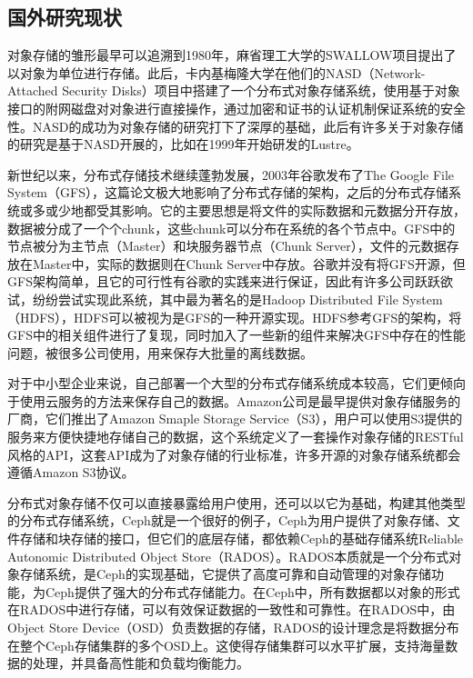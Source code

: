 \subsection{国外研究现状}%
对象存储的雏形最早可以追溯到1980年，麻省理工大学的SWALLOW项目提出了以对象为单位进行存储\cite{7}。此后，卡内基梅隆大学在他们的NASD\cite{8}（Network-Attached Security Disks）项目中搭建了一个分布式对象存储系统，使用基于对象接口的附网磁盘对对象进行直接操作，通过加密和证书的认证机制保证系统的安全性。NASD的成功为对象存储的研究打下了深厚的基础，此后有许多关于对象存储的研究是基于NASD开展的，比如在1999年开始研发的Lustre\cite{9}。

新世纪以来，分布式存储技术继续蓬勃发展，2003年谷歌发布了The Google File System\cite{10}（GFS），这篇论文极大地影响了分布式存储的架构，之后的分布式存储系统或多或少地都受其影响。它的主要思想是将文件的实际数据和元数据分开存放，数据被分成了一个个chunk，这些chunk可以分布在系统的各个节点中。GFS中的节点被分为主节点（Master）和块服务器节点（Chunk Server），文件的元数据存放在Master中，实际的数据则在Chunk Server中存放。谷歌并没有将GFS开源，但GFS架构简单，且它的可行性有谷歌的实践来进行保证，因此有许多公司跃跃欲试，纷纷尝试实现此系统，其中最为著名的是Hadoop Distributed File System\cite{11}（HDFS），HDFS可以被视为是GFS的一种开源实现。HDFS参考GFS的架构，将GFS中的相关组件进行了复现，同时加入了一些新的组件来解决GFS中存在的性能问题，被很多公司使用，用来保存大批量的离线数据。

对于中小型企业来说，自己部署一个大型的分布式存储系统成本较高，它们更倾向于使用云服务的方法来保存自己的数据。Amazon公司是最早提供对象存储服务的厂商，它们推出了Amazon Smaple Storage Service（S3）\cite{12}，用户可以使用S3提供的服务来方便快捷地存储自己的数据，这个系统定义了一套操作对象存储的RESTful风格的API\cite{13}，这套API成为了对象存储的行业标准，许多开源的对象存储系统都会遵循Amazon S3协议。

分布式对象存储不仅可以直接暴露给用户使用，还可以以它为基础，构建其他类型的分布式存储系统，Ceph\cite{27,28}就是一个很好的例子，Ceph为用户提供了对象存储、文件存储和块存储的接口，但它们的底层存储，都依赖Ceph的基础存储系统Reliable Autonomic Distributed Object Store（RADOS）。RADOS本质就是一个分布式对象存储系统，是Ceph的实现基础，它提供了高度可靠和自动管理的对象存储功能，为Ceph提供了强大的分布式存储能力。在Ceph中，所有数据都以对象的形式在RADOS中进行存储，可以有效保证数据的一致性和可靠性。在RADOS中，由Object Store Device（OSD）负责数据的存储，RADOS的设计理念是将数据分布在整个Ceph存储集群的多个OSD上。这使得存储集群可以水平扩展，支持海量数据的处理，并具备高性能和负载均衡能力。

